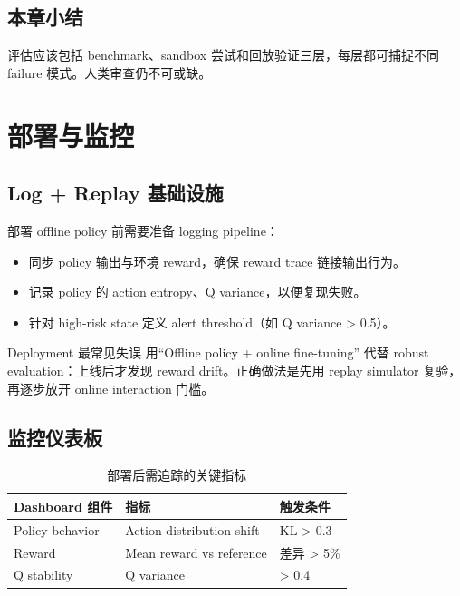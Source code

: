 \documentclass[a4paper]{article}
\begin{document}
\subsection{本章小结}

评估应该包括 benchmark、sandbox 尝试和回放验证三层，每层都可捕捉不同 failure 模式。人类审查仍不可或缺。

\section{部署与监控}

\subsection{Log + Replay 基础设施}

部署 offline policy 前需要准备 logging pipeline：

\begin{itemize}
    \item 同步 policy 输出与环境 reward，确保 reward trace 链接输出行为。
    \item 记录 policy 的 action entropy、Q variance，以便复现失败。
    \item 针对 high-risk state 定义 alert threshold（如 Q variance > 0.5）。
\end{itemize}

\begin{warningbox}{Deployment 最常见失误}
用“Offline policy + online fine-tuning” 代替 robust evaluation：上线后才发现 reward drift。正确做法是先用 replay simulator 复验，再逐步放开 online interaction 门槛。
\end{warningbox}

\subsection{监控仪表板}

\begin{table}[H]
\centering
\begin{tabular}{p{} p{} p{}}
\toprule
Dashboard 组件 & 指标 & 触发条件 \\
\midrule
Policy behavior & Action distribution shift & KL > 0.3 \\
Reward & Mean reward vs reference & 差异 > 5\% \\
Q stability & Q variance & > 0.4 \\
\bottomrule
\end{tabular}
\caption{部署后需追踪的关键指标}
\end{table}
\end{document}
